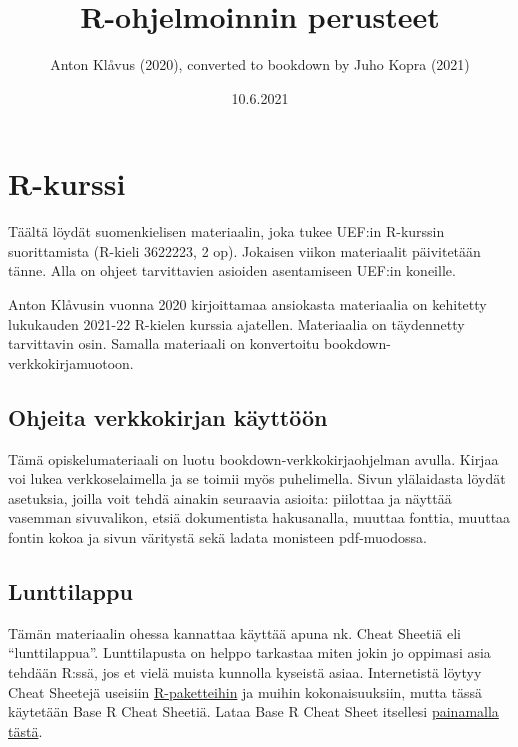\documentclass[
]{book}
\title{R-ohjelmoinnin perusteet}
\author{Anton Klåvus (2020), converted to bookdown by Juho Kopra (2021)}
\date{10.6.2021}
\begin{document}
\maketitle

{
\setcounter{tocdepth}{1}
\tableofcontents
}
\hypertarget{r-kurssi}{%
\chapter*{R-kurssi}\label{r-kurssi}}

Täältä löydät suomenkielisen materiaalin, joka tukee UEF:in R-kurssin suorittamista (R-kieli 3622223, 2 op). Jokaisen viikon materiaalit päivitetään tänne. Alla on ohjeet tarvittavien asioiden asentamiseen UEF:in koneille.

Anton Klåvusin vuonna 2020 kirjoittamaa ansiokasta materiaalia on kehitetty lukukauden 2021-22 R-kielen kurssia ajatellen. Materiaalia on täydennetty tarvittavin osin. Samalla materiaali on konvertoitu bookdown-verkkokirjamuotoon.

\hypertarget{ohjeita-verkkokirjan-kuxe4yttuxf6uxf6n}{%
\section*{Ohjeita verkkokirjan käyttöön}\label{ohjeita-verkkokirjan-kuxe4yttuxf6uxf6n}}

Tämä opiskelumateriaali on luotu bookdown-verkkokirjaohjelman avulla. Kirjaa voi lukea verkkoselaimella ja se toimii myös puhelimella. Sivun ylälaidasta löydät asetuksia, joilla voit tehdä ainakin seuraavia asioita: piilottaa ja näyttää vasemman sivuvalikon, etsiä dokumentista hakusanalla, muuttaa fonttia, muuttaa fontin kokoa ja sivun väritystä sekä ladata monisteen pdf-muodossa.

\hypertarget{lunttilappu}{%
\section*{Lunttilappu}\label{lunttilappu}}

Tämän materiaalin ohessa kannattaa käyttää apuna nk. Cheat Sheetiä eli ``lunttilappua''. Lunttilapusta on helppo tarkastaa miten jokin jo oppimasi asia tehdään R:ssä, jos et vielä muista kunnolla kyseistä asiaa. Internetistä löytyy Cheat Sheetejä useisiin \href{https://www.rstudio.com/resources/cheatsheets/}{R-paketteihin} ja muihin kokonaisuuksiin, mutta tässä käytetään Base R Cheat Sheetiä. Lataa Base R Cheat Sheet itsellesi \href{files/base_R_cheat_sheet.pdf}{painamalla tästä}.
\end{document}
